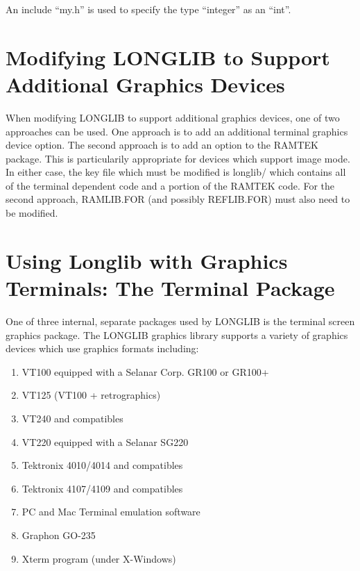 \documentclass[11pt]{report}
\begin{document}
An include ``my.h'' is used to specify the type ``integer'' as an
``int''.


\section{Modifying LONGLIB to Support Additional Graphics Devices}

When modifying LONGLIB to support additional graphics devices, one of
two approaches can be used.  One approach is to add an additional
terminal graphics device option.  The second approach is to add an
option to the RAMTEK package.  This is particularily appropriate for
devices which support image mode.  In either case, the key file which
must be modified is longlib/ which contains all of the terminal
dependent code and a portion of the RAMTEK code.  For the second
approach, RAMLIB.FOR (and possibly REFLIB.FOR) must also need to be
modified.

\section{Using Longlib with Graphics Terminals: The Terminal Package}

One of three internal, separate packages used by LONGLIB is the
terminal screen graphics package.
The LONGLIB graphics library supports a variety of graphics  
devices which use  graphics formats including:

\begin{enumerate}
\item VT100 equipped with a Selanar Corp. GR100 or GR100+
\item VT125 (VT100 + retrographics)
\item VT240 and compatibles
\item VT220 equipped with a Selanar SG220
\item Tektronix 4010/4014 and compatibles
\item Tektronix 4107/4109 and compatibles
\item PC and Mac Terminal emulation software
\item Graphon GO-235
\item Xterm program (under X-Windows)
\end{enumerate}
\end{document}
